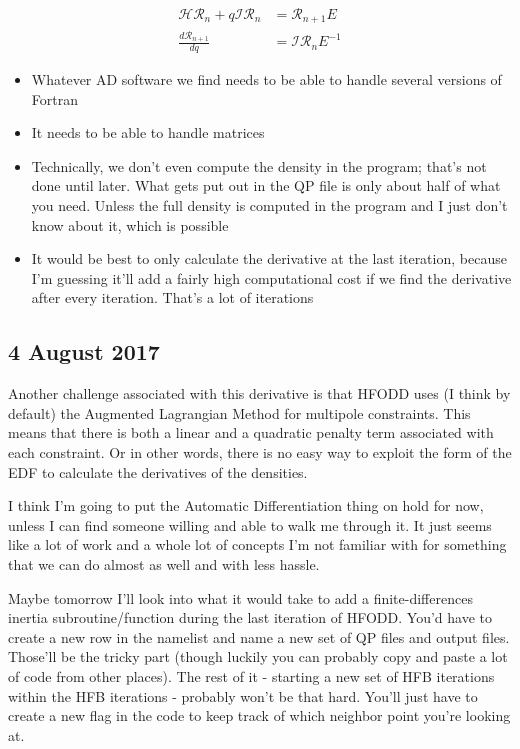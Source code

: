 \begin{eqnarray}
\mathcal{HR}_n+q\mathcal{IR}_n&=\mathcal{R}_{n+1}E \nonumber\\
\frac{d\mathcal{R}_{n+1}}{dq} &= \mathcal{IR}_nE^{-1}
\end{eqnarray}

\begin{itemize}
\item Whatever AD software we find needs to be able to handle several versions of Fortran
\item It needs to be able to handle matrices
\item Technically, we don't even compute the density in the program; that's not done until later. What gets put out in the QP file is only about half of what you need. Unless the full density is computed in the program and I just don't know about it, which is possible
\item It would be best to only calculate the derivative at the last iteration, because I'm guessing it'll add a fairly high computational cost if we find the derivative after every iteration. That's a lot of iterations
\end{itemize}

\subsection*{4 August 2017}
Another challenge associated with this derivative is that HFODD uses (I think by default) the Augmented Lagrangian Method for multipole constraints. This means that there is both a linear and a quadratic penalty term associated with each constraint. Or in other words, there is no easy way to exploit the form of the EDF to calculate the derivatives of the densities.

I think I'm going to put the Automatic Differentiation thing on hold for now, unless I can find someone willing and able to walk me through it. It just seems like a lot of work and a whole lot of concepts I'm not familiar with for something that we can do almost as well and with less hassle.

Maybe tomorrow I'll look into what it would take to add a finite-differences inertia subroutine/function during the last iteration of HFODD. You'd have to create a new row in the namelist and name a new set of QP files and output files. Those'll be the tricky part (though luckily you can probably copy and paste a lot of code from other places). The rest of it - starting a new set of HFB iterations within the HFB iterations - probably won't be that hard. You'll just have to create a new flag in the code to keep track of which neighbor point you're looking at.

